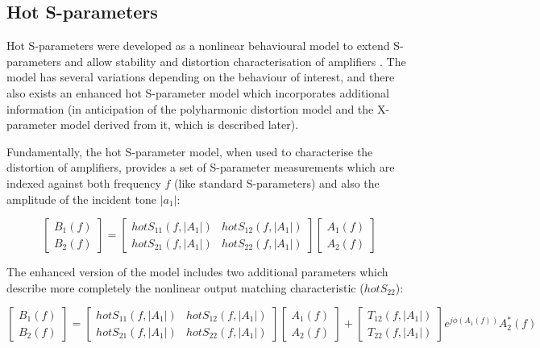 \documentclass[../thesis/thesis.tex]{subfiles}
\begin{document}
\begin{refsection}
\subsection{Hot S-parameters}

Hot S-parameters were developed as a nonlinear behavioural model to extend S-parameters and allow stability and distortion characterisation of amplifiers \cite{Verspecht_2002, Verspecht_2005}. The model has several variations depending on the behaviour of interest, and there also exists an enhanced hot S-parameter model which incorporates additional information (in anticipation of the polyharmonic distortion model and the X-parameter model derived from it, which is described later).

Fundamentally, the hot S-parameter model, when used to characterise the distortion of amplifiers, provides a set of S-parameter measurements which are indexed against both frequency $f$ (like standard S-parameters) and also the amplitude of the incident tone $|a_1|$:

\begin{equation}
	\begin{bmatrix}
		B_1(f) \\ 
		B_2(f) 
	\end{bmatrix}
	= 
	\begin{bmatrix}
		hotS_{11}(f, |A_1|) & hotS_{12}(f, |A_1|) \\
		hotS_{21}(f, |A_1|) & hotS_{22}(f, |A_1|)
	\end{bmatrix}
	\begin{bmatrix}
	A_1(f) \\ 
	A_2(f) 
	\end{bmatrix}
\end{equation}

The enhanced version of the model includes two additional parameters which describe more completely the nonlinear output matching characteristic ($hotS_{22}$):

\begin{equation}
	\begin{bmatrix}
		B_1(f) \\ 
		B_2(f) 
	\end{bmatrix}
	= 
	\begin{bmatrix}
		hotS_{11}(f, |A_1|) & hotS_{12}(f, |A_1|) \\
		hotS_{21}(f, |A_1|) & hotS_{22}(f, |A_1|)
	\end{bmatrix}
	\begin{bmatrix}
		A_1(f) \\ 
		A_2(f) 
	\end{bmatrix}
	+
	\begin{bmatrix}
		T_{12}(f, |A_1|) \\ 
		T_{22}(f, |A_1|) 
	\end{bmatrix}
	e^{j\phi(A_1(f))}A_2^*(f)
	\label{ch5_eqn_hotsp}
\end{equation}


\end{refsection}
\end{document}
